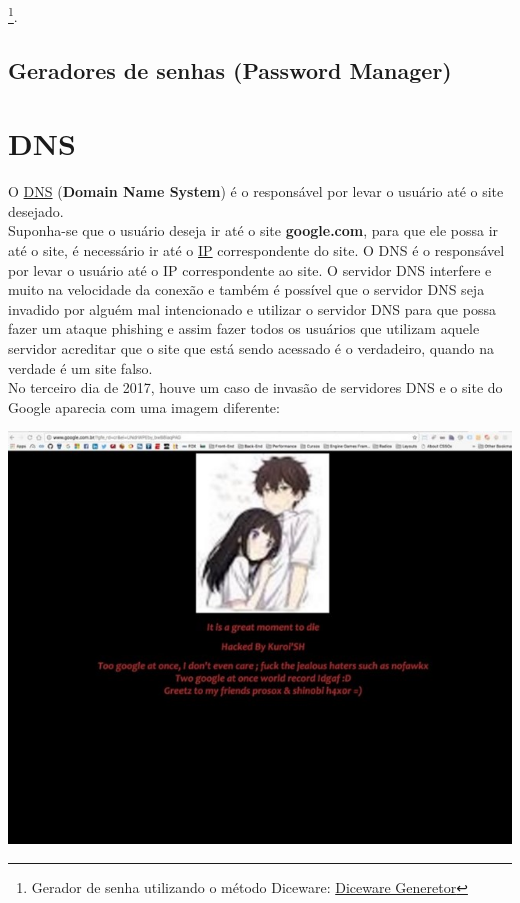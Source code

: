 \documentclass[12pt, letterpaper]{report}
\begin{document}
	\footnote{Gerador de senha utilizando o método Diceware: \href{https://github.com/caioau/personal/blob/master/DicewareGen/dicewareGen.py}{Diceware Generetor}}.

\subsection{Geradores de senhas (Password Manager)}


\pagebreak

\section*{DNS}
	O \href{https://criptowiki.miraheze.org/wiki/DNS_(Domain_Name_System)}{DNS} (\textbf{Domain Name System}) é o responsável por levar o usuário até o site desejado.\\
	Suponha-se que o usuário deseja ir até o site \textbf{google.com}, para que ele possa ir até o site, é necessário ir até o \href{https://pt.wikipedia.org/wiki/IP}{IP} correspondente do site. O DNS é o responsável por levar o usuário até o IP correspondente ao site.
	O servidor DNS interfere e muito na velocidade da conexão e também é possível que o servidor DNS seja invadido por alguém mal intencionado e utilizar o servidor DNS para que possa fazer um ataque phishing e assim fazer todos os usuários que utilizam aquele servidor acreditar que o site que está sendo acessado é o verdadeiro, quando na verdade é um site falso.\\

	No terceiro dia de 2017, houve um caso de invasão de servidores DNS e o site do Google aparecia com uma imagem diferente:

\begin{center} %
	\includegraphics[scale=0.7]{dns.jpg}\\
\end{center}
\end{document}
